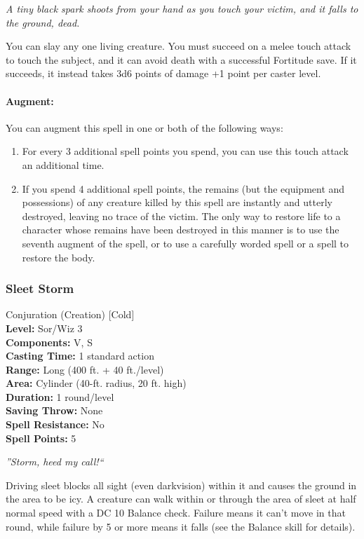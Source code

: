 \emph{A tiny black spark shoots from your hand as you touch your victim, and it falls to the ground, dead.}

You can slay any one living creature. 
You must succeed on a melee touch attack to touch the subject, and it can avoid death with a successful Fortitude save. 
If it succeeds, it instead takes 3d6 points of damage +1 point per caster level.

\paragraph{Augment:} You can augment this spell in one or both of the following ways:
\begin{enumerate}
 \item For every 3 additional spell points you spend, you can use this touch attack an additional time.
 \item If you spend 4 additional spell points, the remains (but the equipment and possessions) of any creature killed by this spell are instantly and utterly destroyed, leaving no trace of the victim.
 The only way to restore life to a character whose remains have been destroyed in this manner is to use the seventh augment of the  spell, or to use a carefully worded  spell or a  spell to restore the body.
\end{enumerate}
\subsubsection{Sleet Storm}
\label{Spell:SleetStorm}
Conjuration (Creation) [Cold]
\\ \textbf{Level:} Sor/Wiz 3
\\ \textbf{Components:} V, S
\\ \textbf{Casting Time:} 1 standard action
\\ \textbf{Range:} Long (400 ft. + 40 ft./level)
\\ \textbf{Area:} Cylinder (40-ft. radius, 20 ft. high)
\\ \textbf{Duration:} 1 round/level
\\ \textbf{Saving Throw:} None
\\ \textbf{Spell Resistance:} No
\\ \textbf{Spell Points:} 5

\emph{''Storm, heed my call!``}

Driving sleet blocks all sight (even darkvision) within it and causes the ground in the area to be icy. 
A creature can walk within or through the area of sleet at half normal speed with a DC 10 Balance check. 
Failure means it can't move in that round, while failure by 5 or more means it falls (see the Balance skill for details).

